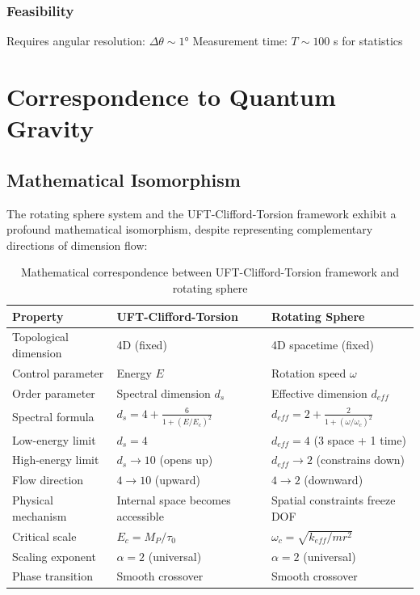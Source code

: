 \documentclass[UTF8]{ctex}\n\documentclass[12pt,a4paper]{article}
\begin{document}
\subsubsection{Feasibility}

Requires angular resolution: $\Delta\theta \sim 1°$  
Measurement time: $T \sim 100$ s for statistics

\section{Correspondence to Quantum Gravity}
\label{sec:correspondence}

\subsection{Mathematical Isomorphism}

The rotating sphere system and the UFT-Clifford-Torsion framework exhibit a profound mathematical isomorphism, despite representing complementary directions of dimension flow:

\begin{table}[h]
\centering
\begin{tabular}{p{4cm}p{5cm}p{5cm}}
\toprule
\textbf{Property} & \textbf{UFT-Clifford-Torsion} & \textbf{Rotating Sphere} \\
\midrule
Topological dimension & 4D (fixed) & 4D spacetime (fixed) \\
Control parameter & Energy $E$ & Rotation speed $\omega$ \\
Order parameter & Spectral dimension $d_s$ & Effective dimension $d_{eff}$ \\
Spectral formula & $d_s = 4 + \frac{6}{1+(E/E_c)^2}$ & $d_{eff} = 2 + \frac{2}{1+(\omega/\omega_c)^2}$ \\
Low-energy limit & $d_s = 4$ & $d_{eff} = 4$ (3 space + 1 time) \\
High-energy limit & $d_s \to 10$ (opens up) & $d_{eff} \to 2$ (constrains down) \\
Flow direction & $4 \to 10$ (upward) & $4 \to 2$ (downward) \\
Physical mechanism & Internal space becomes accessible & Spatial constraints freeze DOF \\
Critical scale & $E_c = M_P/\tau_0$ & $\omega_c = \sqrt{k_{eff}/mr^2}$ \\
Scaling exponent & $\alpha = 2$ (universal) & $\alpha = 2$ (universal) \\
Phase transition & Smooth crossover & Smooth crossover \\
\bottomrule
\end{tabular}
\caption{Mathematical correspondence between UFT-Clifford-Torsion framework and rotating sphere}
\label{tab:correspondence}
\end{table}
\end{document}
